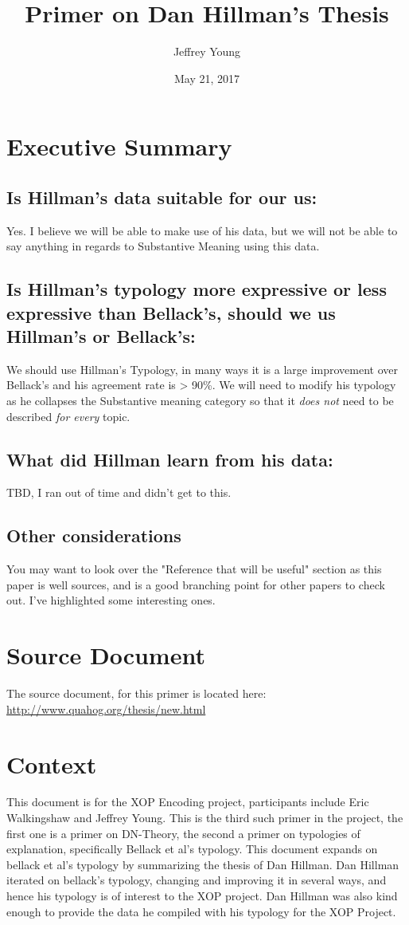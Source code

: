 \documentclass[10pt, letterpaper]{article}
\author{Jeffrey Young}
\date{May 21, 2017}
\title{Primer on Dan Hillman's Thesis}
\begin{document}
\maketitle

\section*{Executive Summary}
\label{sec:orgc05307c}
\subsection*{Is Hillman's data suitable for our us:}
\label{sec:org802bb86}
Yes. I believe we will be able to make
use of his data, but we will not be able to say anything in regards to
Substantive Meaning using this data.

\subsection*{Is Hillman's typology more expressive or less expressive than Bellack's, should we us Hillman's or Bellack's:}
\label{sec:org6f1692c}
We should use Hillman's Typology, in many
ways it is a large improvement over Bellack's and his agreement rate is > 90\%.
We will need to modify his typology as he collapses the Substantive meaning
category so that it \emph{does not} need to be described \emph{for every} topic. 

\subsection*{What did Hillman learn from his data:}
\label{sec:org1516f70}
TBD, I ran out of time and didn't get to this.

\subsection*{Other considerations}
\label{sec:org9c7dff5}
You may want to look over the "Reference that will be useful" section as this
paper is well sources, and is a good branching point for other papers to
check out. I've highlighted some interesting ones.
\section*{Source Document}
\label{sec:org09f9064}
The source document, for this primer is located here:
\url{http://www.quahog.org/thesis/new.html}
\section*{Context}
\label{sec:orgce5ea3c}
This document is for the XOP Encoding project, participants include Eric
Walkingshaw and Jeffrey Young. This is the third such primer in the project,
the first one is a primer on DN-Theory, the second a primer on typologies of
explanation, specifically Bellack et al's typology. This document expands on
bellack et al's typology by summarizing the thesis of Dan Hillman. Dan Hillman
iterated on bellack's typology, changing and improving it in several ways, and
hence his typology is of interest to the XOP project. Dan Hillman was also kind
enough to provide the data he compiled with his typology for the XOP Project.
\end{document}
